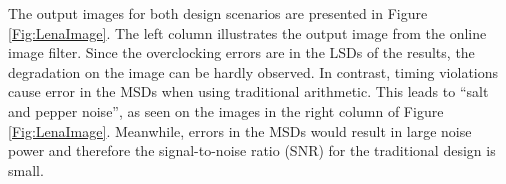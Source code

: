 \documentclass{acm_proc_article-sp}
\begin{document}
The output images for both design scenarios are presented in Figure \ref{Fig:LenaImage}. The left column illustrates the output image from the online image filter. Since the overclocking errors are in the LSDs of the results, the degradation on the image can be hardly observed. In contrast, timing violations cause error in the MSDs when using traditional arithmetic. This leads to ``salt and pepper noise'', as seen on the images in the right column of Figure \ref{Fig:LenaImage}. Meanwhile, errors in the MSDs would result in large noise power and therefore the signal-to-noise ratio (SNR) for the traditional design is small.

\begin{figure}[tbp]
  \centering
  \vspace{-1ex}
\end{figure}
\end{document}
